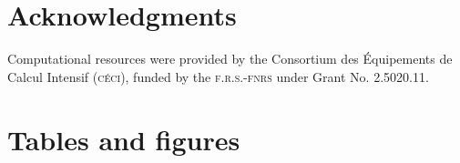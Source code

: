 \documentclass[utf8]{frontiersSCNS}
\begin{document}
\section*{Acknowledgments}
Computational resources were provided by the Consortium des \'Equipements de Calcul Intensif (\textsc{c\'eci}), funded by the \textsc{f.r.s.-fnrs} under Grant No. 2.5020.11.


 



\section*{Tables and figures}
\end{document}
